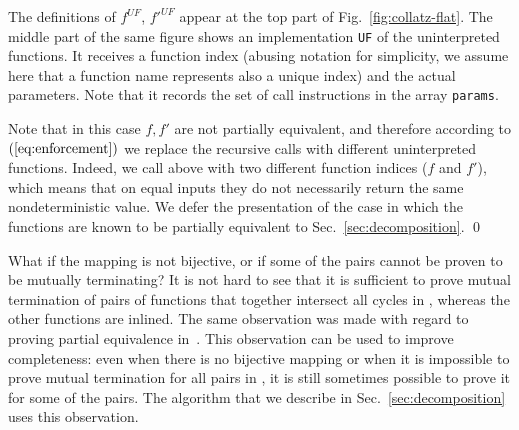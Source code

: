 \begin{example}
The definitions of $f^{UF}$, $f'^{UF}$ appear at the top part of Fig.~\ref{fig:collatz-flat}. The middle part of the same figure shows an implementation {\tt UF} of the uninterpreted functions. It receives a function index (abusing notation for simplicity, we assume here that a function name represents also a unique index) and the actual parameters. Note that it records the set of call instructions in the array {\tt params}.






Note that in this case $f,f'$ are not partially equivalent, and therefore according to $(\ref{eq:enforcement})$ we replace the recursive calls with different uninterpreted functions. Indeed, we call  above with two different function indices ($f$ and $f'$), which means that on equal inputs they do not necessarily return the same nondeterministic value.
We defer the presentation of the case in which the functions are known to be partially equivalent to Sec.~\ref{sec:decomposition}.
%
\qed
\end{example}

What if the mapping is not bijective, or if some of the pairs cannot be proven to be mutually terminating? It is not hard to see that it is sufficient to prove mutual termination of pairs of functions that together intersect all cycles in , whereas the other functions are inlined. The same observation was made with regard to proving partial equivalence in~\cite{GS11}.
This observation can be used to improve completeness: even when there is no bijective mapping or when it is impossible to prove mutual termination for all pairs in , it is still sometimes possible to prove it for some of the pairs. The algorithm that we describe in Sec.~\ref{sec:decomposition} uses this observation.


